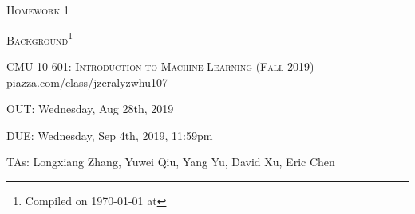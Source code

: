 \documentclass[12pt]{article}
\begin{document}
\section*{}
\begin{center}
  \centerline{\textsc{\LARGE  Homework 1}}
  \vspace{0.5em}
  \centerline{\textsc{\LARGE Background}\footnote{Compiled on \today{} at \currenttime{}}}
  \vspace{1em}
  \textsc{\large CMU 10-601: Introduction to Machine Learning (Fall 2019)} \\
  \vspace{0.5em}
  \url{piazza.com/class/jzcralyzwhu107} \\
  \vspace{0.5em}
  \centerline{OUT: Wednesday, Aug 28th, 2019}
  \vspace{0.5em}
  \centerline{DUE: Wednesday, Sep 4th, 2019, 11:59pm}
    \centerline{TAs: Longxiang Zhang, Yuwei Qiu, Yang Yu, David Xu, Eric Chen}
\end{center}
\end{document}
